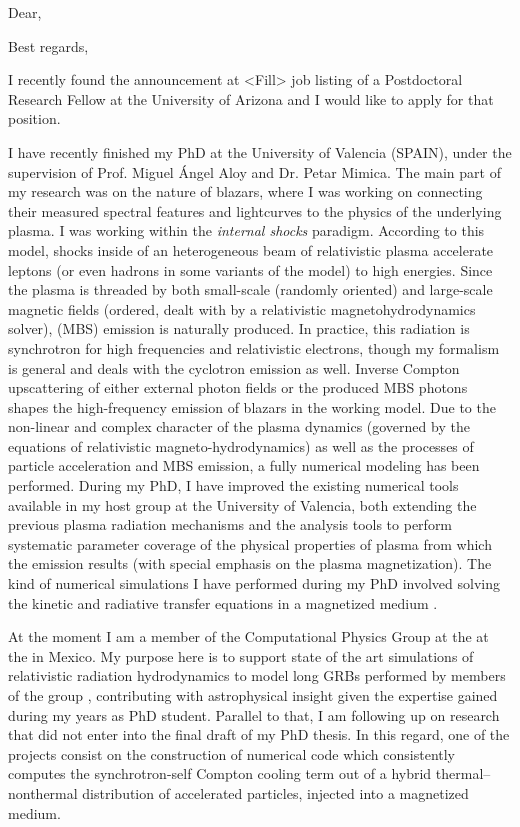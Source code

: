 \date{\today}
\opening{Dear,}
\closing{Best regards,}

%
\makelettertitle%

I recently found the announcement at <Fill> job listing of a Postdoctoral Research Fellow at the University of Arizona and I would like to apply for that position.

I have recently finished my PhD at the University of Valencia (SPAIN), under the supervision of Prof. Miguel \'{A}ngel Aloy and Dr. Petar Mimica. The main part of my research was on the nature of blazars, where I was working on connecting their measured spectral features and lightcurves to the physics of the underlying plasma. I was working within the \emph{internal shocks} paradigm. According to this model, shocks inside of an heterogeneous beam of relativistic plasma accelerate leptons (or even hadrons in some variants of the model) to high energies. Since the plasma is threaded by both small-scale (randomly oriented) and large-scale magnetic fields (ordered, dealt with by a relativistic magnetohydrodynamics solver), \mbs (MBS) emission is naturally produced. In practice, this radiation is synchrotron for high frequencies and relativistic electrons, though my formalism is general and deals with the cyclotron emission as well. Inverse Compton upscattering of either external photon fields or the produced MBS photons shapes the high-frequency emission of blazars in the working model. Due to the non-linear and complex character of the plasma dynamics (governed by the equations of relativistic magneto-hydrodynamics) as well as the processes of particle acceleration and MBS emission, a fully numerical modeling has been performed. During my PhD, I have improved the existing numerical tools available in my host group at the University of Valencia, both extending the previous plasma radiation mechanisms and the analysis tools to perform systematic parameter coverage of the physical properties of plasma from which the emission results (with special emphasis on the plasma magnetization). The kind of numerical simulations I have performed during my PhD involved solving the kinetic and radiative transfer equations in a magnetized medium .

At the moment I am a member of the Computational Physics Group at the \IFMen{} at the \UMSNHen{} in Mexico. My purpose here is to support state of the art simulations of relativistic radiation hydrodynamics to model long GRBs performed by members of the group , contributing with astrophysical insight given the expertise gained during my years as PhD student. Parallel to that, I am following up on research that did not enter into the final draft of my PhD thesis. In this regard, one of the projects consist on the construction of numerical code which consistently computes the synchrotron-self Compton cooling term out of a hybrid thermal--nonthermal  distribution  of accelerated particles, injected into a magnetized medium.

